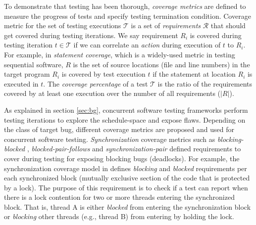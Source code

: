 %
To demonstrate that testing has been thorough, \textit{coverage metrics} are defined to measure the progress of tests and specify testing termination condition.
%
Coverage metric for the set of testing executions $\mathcal{T}$ is a set of \textit{requirements} $\mathcal{R}$ that should get covered during testing iterations.
%
We say requirement $R_i$ is covered during testing iteration $t \in \mathcal{T}$ if we can correlate an \textit{action} during execution of $t$ to $R_i$.
%
For example, in \textit{statement coverage}, which is a widely-used metric in testing sequential software, $R$ is the set of source locations (file and line numbers) in the target program
%
$R_i$ is covered by test execution $t$ if the statement at location $R_i$ is executed in $t$.
%
The \textit{coverage percentage} of a test $\mathcal{T}$ is the ratio of the requirements covered by at least one execution over the number of all requirements ($|R|$).

As explained in section \ref{sec:bg}, concurrent software testing frameworks perform testing iterations to explore the schedule-space and expose flaws.
%
Depending on the class of target bug, different coverage metrics are proposed and used for concurrent software testing.
%
\textit{Synchronization} coverage metrics such as \textit{blocking-blocked} \cite{edelstein2003contest}, \textit{blocked-pair-follows} \cite{trainin-followsCoverage-padtad09} and \textit{synchronization-pair} \cite{hong-syncTesting-issta12} defined requirements to cover during testing for exposing blocking bugs (\eg deadlocks).
%
%
For example, the synchronization coverage model in \cite{edelstein2003contest} defines \textit{blocking} and \textit{blocked} requirements per each synchronized block (\ie mutually exclusive section of the code that is protected by a lock).
%
The purpose of this requirement is to check if a test can report when there is a lock contention for two or more threads entering the synchronized block.
%
That is, thread A is either \textit{blocked} from entering the synchronization block or \textit{blocking} other threads (e.g., thread B) from entering by holding the lock.
%

